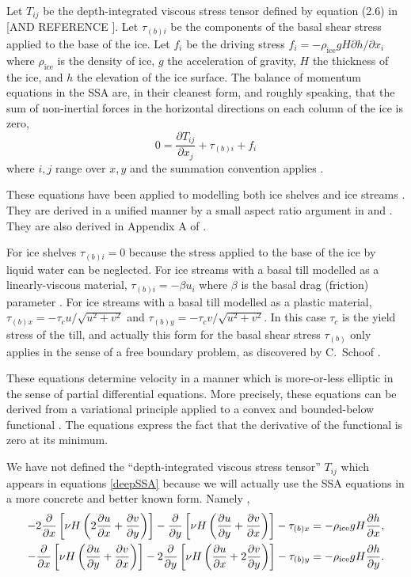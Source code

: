 \documentclass[12pt]{amsart}%
\theoremstyle{plain}
\theoremstyle{definition}
\newcommand{\ddx}[1]{\ensuremath{\frac{\partial #1}{\partial x}}}
\newcommand{\ddy}[1]{\ensuremath{\frac{\partial #1}{\partial y}}}
\newcommand{\rhoi}{\ensuremath{\rho_{\text{ice}}}}
\begin{document}
Let $T_{ij}$ be the depth-integrated viscous stress tensor defined by equation (2.6) in \cite{SchoofStream} [AND REFERENCE \cite{Morland}].  Let $\tau_{(b)i}$ be the components of the basal shear stress applied to the base of the ice.  Let $f_i$ be the driving stress $f_i = - \rhoi g H \partial h/\partial x_i$ where $\rhoi$ is the density of ice, $g$ the acceleration of gravity, $H$ the thickness of the ice, and $h$ the elevation of the ice surface.  The balance of momentum equations in the SSA are, in their cleanest form, and roughly speaking, that the sum of non-inertial forces in the horizontal directions on each column of the ice is zero,
\begin{equation}\label{deepSSA}
  0 = \frac{\partial T_{ij}}{\partial x_j} + \tau_{(b)i} + f_i
\end{equation}
where $i,j$ range over $x,y$ and the summation convention applies \cite{SchoofStream}.

These equations have been applied to modelling both ice shelves \cite{MacAyealetal} and ice streams \cite{MacAyeal}.  They are derived in a unified manner by a small aspect ratio argument in \cite{Morland} and \cite{WeisGreveHutter}.  They are also derived in Appendix A of \cite{SchoofStream}.

For ice shelves $\tau_{(b)i} = 0$ because the stress applied to the base of the ice by liquid water can be neglected.  For ice streams with a basal till modelled as a linearly-viscous material, $\tau_{(b)i} = - \beta u_i$ where $\beta$ is the basal drag (friction) parameter \cite{HulbeMacAyeal,MacAyeal}.  For ice streams with a basal till modelled as a plastic material, $\tau_{(b)x} = - \tau_c u/\sqrt{u^2 + v^2}$ and $\tau_{(b)y} = - \tau_c v/\sqrt{u^2 + v^2}$.  In this case $\tau_c$ is the yield stress of the till, and actually this form for the basal shear stress $\tau_{(b)}$ only applies in the sense of a free boundary problem, as discovered by C.~Schoof \cite{SchoofStream}.

These equations determine velocity in a manner which is more-or-less elliptic in the sense of partial differential equations.  More precisely, these equations can be derived from a variational principle applied to a convex and bounded-below functional \cite{SchoofStream}.  The equations express the fact that the derivative of the functional is zero at its minimum.

We have not defined the ``depth-integrated viscous stress tensor'' $T_{ij}$ which appears in equations \eqref{deepSSA} because we will actually use the SSA equations in a more concrete and better known form.  Namely \cite{HulbeMacAyeal,Morland,SchoofStream},
\begin{align}\label{SSA}
 - 2 \ddx{}\left[\nu H \left(2 \ddx{u} + \ddy{v}\right)\right]
 - \ddy{}\left[\nu H \left(\ddy{u} + \ddx{v}\right)\right] - \tau_{(b)x}
        &= - \rhoi g H \frac{\partial h}{\partial x}, \\
 - \ddx{}\left[\nu H \left(\ddy{u} + \ddx{v}\right)\right]
 - 2 \ddy{}\left[\nu H \left(\ddx{u} + 2 \ddy{v}\right)\right] - \tau_{(b)y}
        &= - \rhoi g H \frac{\partial h}{\partial y}.\notag
\end{align}
\end{document}

